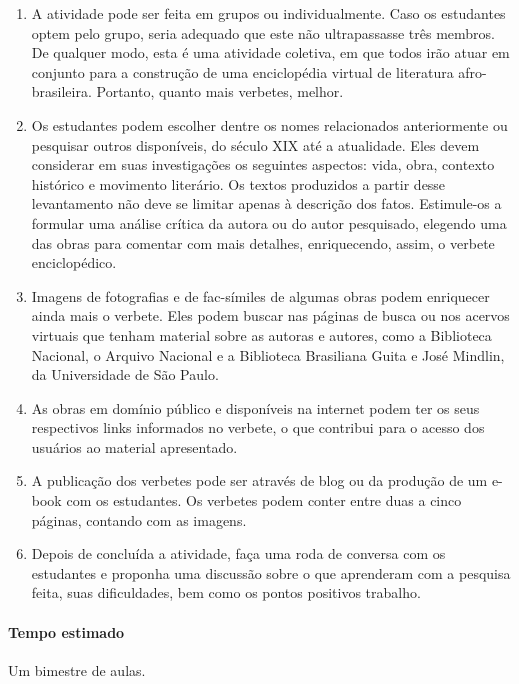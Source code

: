 \documentclass[12pt]{extarticle}
\begin{document}
\begin{enumerate}
\item
A atividade pode ser feita em grupos ou
individualmente. Caso os estudantes optem pelo grupo, seria adequado que
este não ultrapassasse três membros. De qualquer modo, esta é uma
atividade coletiva, em que todos irão atuar em conjunto para a
construção de uma enciclopédia virtual de literatura afro-brasileira.
Portanto, quanto mais verbetes, melhor.

\item
Os estudantes podem escolher dentre os nomes relacionados
anteriormente ou pesquisar outros disponíveis, do século XIX até a
atualidade. Eles devem considerar em suas investigações os seguintes
aspectos: vida, obra, contexto histórico e movimento literário. Os
textos produzidos a partir desse levantamento não deve se limitar apenas
à descrição dos fatos. Estimule-os a formular uma análise crítica da
autora ou do autor pesquisado, elegendo uma das obras para comentar com
mais detalhes, enriquecendo, assim, o verbete enciclopédico.

\item
Imagens de fotografias e de fac-símiles de algumas obras podem
enriquecer ainda mais o verbete. Eles podem buscar nas páginas de busca
ou nos acervos virtuais que tenham material sobre as autoras e autores,
como a Biblioteca Nacional, o Arquivo Nacional e a Biblioteca Brasiliana
Guita e José Mindlin, da Universidade de São Paulo.

\item
As obras em domínio público e disponíveis na internet podem ter os
seus respectivos links informados no verbete, o que contribui para o
acesso dos usuários ao material apresentado.

\item
A publicação dos verbetes pode ser através de blog ou da produção de
um e-book com os estudantes. Os verbetes podem conter entre duas a cinco
páginas, contando com as imagens.

\item
Depois de concluída a atividade, faça uma roda de conversa com os
estudantes e proponha uma discussão sobre o que aprenderam com a
pesquisa feita, suas dificuldades, bem como os pontos positivos
trabalho.
\end{enumerate}

\paragraph{Tempo estimado} Um bimestre de aulas.
\end{document}
